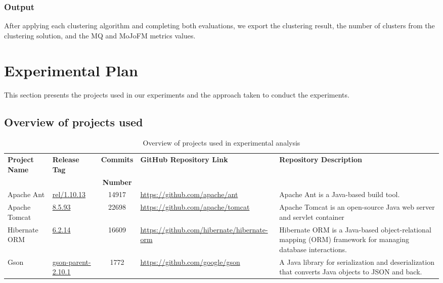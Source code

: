 \documentclass{ieeeaccess}
\begin{document}
\subsubsection{Output}

After applying each clustering algorithm and completing both evaluations, we export the clustering result, the number of clusters from the clustering solution, and the MQ and MoJoFM metrics values.



\section{Experimental Plan}
\label{sec:plan}

This section presents the projects used in our experiments and the approach taken to conduct the experiments.

\subsection{Overview of projects used}
\begin{table}
\centering
\caption{Overview of projects used in experimental analysis}
\label{tab:project_info}
\setlength{\tabcolsep}{7pt} 
\begin{tabular}{|l|l|c|l|p{4.7cm}|}
\hline
\textbf{Project Name} & \textbf{Release Tag} & \textbf{Commits} & \textbf{GitHub Repository Link} & \textbf{Repository Description} \\ 
 &  & \textbf{Number} & &  \\ \hline
Apache Ant & \href{https://github.com/apache/ant/tree/rel/1.10.13}{rel/1.10.13} & 14917 & \href{https://github.com/apache/ant}{https://github.com/apache/ant} & Apache Ant is a Java-based build tool. \\ \hline
Apache Tomcat & \href{https://github.com/apache/tomcat/tree/8.5.93}{8.5.93} & 22698 & \href{https://github.com/apache/tomcat}{https://github.com/apache/tomcat} & 
Apache Tomcat is an open-source Java web server and servlet container\\ \hline
Hibernate ORM & \href{https://github.com/hibernate/hibernate-orm/tree/6.2.14}{6.2.14} & 16609 & \href{https://github.com/hibernate/hibernate-orm}{https://github.com/hibernate/hibernate-orm} & Hibernate ORM is a Java-based object-relational mapping (ORM) framework for managing database interactions. \\ \hline
Gson & \href{https://github.com/google/gson/tree/gson-parent-2.10.1}{gson-parent-2.10.1} & 1772 & \href{https://github.com/google/gson}{https://github.com/google/gson} & A Java library for serialization and deserialization that converts Java objects to JSON and back. \\ \hline
\end{tabular}
\end{table}
\end{document}
